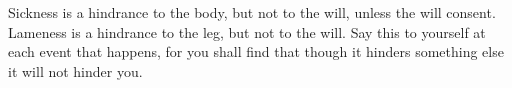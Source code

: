 Sickness is  a hindrance  to the  body, but not  to the  will, unless  the will
consent. Lameness is a  hindrance to the leg, but not to the  will. Say this to
yourself at each event that happens, for  you shall find that though it hinders
something else it will not hinder you.

